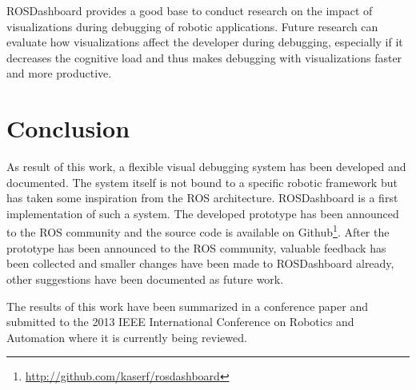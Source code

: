  ROSDashboard provides a good base to conduct research on the impact of visualizations during debugging of robotic applications. Future research can evaluate how visualizations affect the developer during debugging, especially if it decreases the cognitive load and thus makes debugging with visualizations faster and more productive.

\section{Conclusion}


As result of this work, a flexible visual debugging system has been developed and documented. The system itself is not bound to a specific robotic framework but has taken some inspiration from the ROS architecture. ROSDashboard is a first implementation of such a system. The developed prototype has been announced to the ROS community and the source code is available on Github\footnote{\url{http://github.com/kaserf/rosdashboard}}. After the prototype has been announced to the ROS community, valuable feedback has been collected and smaller changes have been made to ROSDashboard already, other suggestions have been documented as future work.

The results of this work have been summarized in a conference paper and submitted to the 2013 IEEE International Conference on Robotics and Automation where it is currently being reviewed.
